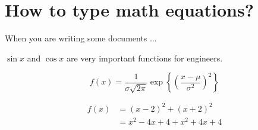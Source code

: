 \documentclass{article}
\begin{document}
\section {How to type math equations?}


When you are writing some documents ...

$\sin x $ and $\cos x $ are very important functions for engineers. 

\begin{equation}
f(x) = \frac{1}{\sigma \sqrt{2\pi} } \exp \left\{ \left( \frac{x-\mu} {\sigma^2 }\right)^2 \right\}
\end{equation}

\begin{align}
f(x) & = (x-2)^2 + (x+2)^2 \nonumber\\
   	 & = x^2 -4x + 4 + x^2 + 4x + 4
\end{align}
\end{document}
